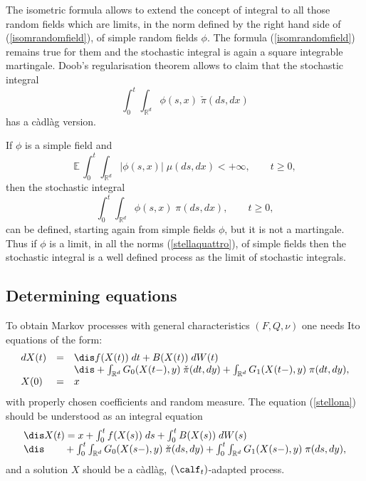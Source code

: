 \documentclass[preprint]{imsart}
\def\E{\mathbb E}
\def\R{\mathbb R}
\begin{document}
{The isometric formula allows to extend the concept of integral to
all those random fields which are limits, in the norm defined
by the right hand side of (\ref{isomrandomfield}), of simple
random fields $\phi$. The formula (\ref{isomrandomfield}) remains
true for them and the stochastic integral is again a square
integrable martingale.  Doob's regularisation theorem allows to
claim that the stochastic integral
$$
 \int_0^t\int_{\R^d}\phi(s,x)\; \check{\pi}(ds,dx)
$$
has  a c\`adl\`ag version.

If $\phi$ is a simple field and
\begin{equation}\label{stellaquattro}
  \E\,\int_0^t \int_{\R^d}|\phi(s,x)|\;\mu( ds,dx)<+\infty,
  \qquad t\ge0,
\end{equation}
then the stochastic integral
\begin{equation}\label{stellacinque}
 \int_0^t\int_{\R^d}\phi(s,x)\; {\pi}(ds,dx),
  \qquad t\ge0,
\end{equation}
can be defined, starting again from simple fields $\phi$, but it
is not a martingale. Thus if $\phi$ is a limit, in
all the norms (\ref{stellaquattro}), of simple fields  then the stochastic integral
is a well defined process as the limit of stochastic integrals.

\subsection{Determining equations}

 To obtain Markov processes with general characteristics
$(F,Q,\nu)$ one needs Ito equations of the form:
\begin{equation}\label{stellona}
\begin{array}{lll}
  dX(t) & = &
  \dis f(X(t))\; dt+B(X(t))\; dW(t) \\
   &  &\dis  +
  \int_{\R^d}G_0(X(t-),y)\;\check{\pi}(dt,dy)
  +\int_{\R^d}G_1(X(t-),y)\;{\pi}(dt,dy), \\
  X(0) & = & x
\end{array}
\end{equation}
with properly chosen coefficients and random measure.
The equation (\ref{stellona}) should be understood as an integral
equation
\begin{equation}\label{stellonadue}
\begin{array}{l}\dis
X(t) = x+\int_0^t f(X(s))\; ds+
\int_0^tB(X(s))\; dW(s) \\
\dis\qquad+\int_0^t
  \int_{\R^d}G_0(X(s-),y)\;\check{\pi}(ds,dy)
  +\int_0^t\int_{\R^d}G_1(X(s-),y)\;{\pi}(ds,dy),
\end{array}
\end{equation}
and a solution $X$ should be a c\`adl\`ag,
$(\calf_t)$-adapted process.

}
\end{document}
